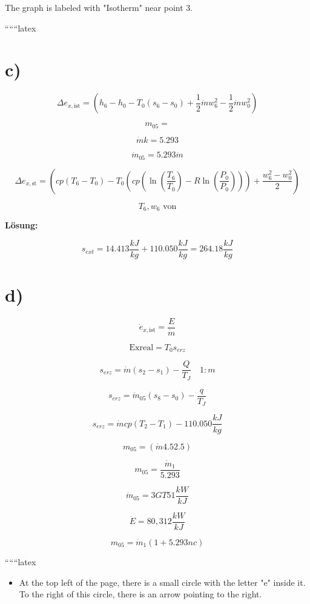 The graph is labeled with "Isotherm" near point 3.

``````latex

\section*{c)}

\[
\Delta e_{x, \text{ist}} = (h_6 - h_0 - T_0 (s_6 - s_0) + \frac{1}{2} \dot{m} w_6^2 - \frac{1}{2} \dot{m} w_0^2)
\]

\[
m_{05} = 
\]

\[
\dot{m} k = 5.293
\]

\[
\dot{m}_{05} = 5.293 \dot{m}
\]

\[
\Delta e_{x, \text{st}} = (cp (T_6 - T_0) - T_0 \left( cp \left( \ln \left( \frac{T_6}{T_0} \right) - R \ln \left( \frac{P_0}{P_0} \right) \right) \right) + \frac{w_6^2 - w_0^2}{2})
\]

\[
T_6, w_6 \text{ von}
\]

\textbf{Lösung:}

\[
s_{ext} = 14.413 \frac{kJ}{kg} + 110.050 \frac{kJ}{kg} = 264.18 \frac{kJ}{kg}
\]

\section*{d)}

\[
\dot{e}_{x, \text{ist}} = \frac{E}{\dot{m}}
\]

\[
\text{Exreal} = T_0 s_{erz}
\]

\[
s_{erz} = \dot{m} (s_2 - s_1) - \frac{Q}{T_J} \quad 1:m
\]

\[
s_{erz} = \dot{m}_{05} (s_8 - s_0) - \frac{q}{T_J}
\]

\[
s_{erz} = \dot{m} cp (T_2 - T_1) - 110.050 \frac{kJ}{kg}
\]

\[
m_{05} = (\dot{m} 4.5 2.5)
\]

\[
m_{05} = \frac{\dot{m}_1}{5.293}
\]

\[
\dot{m}_{05} = 3 GT 5 1 \frac{kW}{kJ}
\]

\[
\dot{E} = 80,3 12 \frac{kW}{kJ}
\]

\[
m_{05} = \dot{m}_1 (1 + 5.293 nc)
\]

``````latex


\begin{itemize}
    \item At the top left of the page, there is a small circle with the letter "e" inside it. To the right of this circle, there is an arrow pointing to the right.
\end{itemize}

